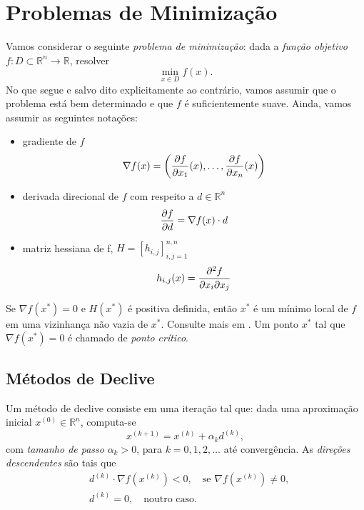 \section{Problemas de Minimização}\label{cap_otimizacao_sec_minimi}

Vamos considerar o seguinte \emph{problema de minimização}: dada a \emph{função objetivo} $f:D\subset \mathbb{R}^n\to\mathbb{R}$, resolver
\begin{equation}
  \min_{x\in D} f(x).
\end{equation}
No que segue e salvo dito explicitamente ao contrário, vamos assumir que o problema está bem determinado e que $f$ é suficientemente suave. Ainda, vamos assumir as seguintes notações:
\begin{itemize}
\item gradiente de $f$
  \begin{equation}
    \nabla f(x) = \left(\frac{\partial f}{\partial x_1}(x),\dotsc,\frac{\partial f}{\partial x_n}(x)\right)
  \end{equation}
\item derivada direcional de $f$ com respeito a $d\in\mathbb{R}^n$
  \begin{equation}
    \frac{\partial f}{\partial d} = \nabla f(x)\cdot d
  \end{equation}
\item matriz hessiana de f, $H=[h_{i,j}]_{i,j=1}^{n,n}$
  \begin{equation}
    h_{i,j}(x) = \frac{\partial^2 f}{\partial x_i\partial x_j}
  \end{equation}
\end{itemize}

\begin{obs}
  Se $\nabla f(x^*) = 0$ e $H(x^*)$ é positiva definida, então $x^*$ é um mínimo local de $f$ em uma vizinhança não vazia de $x^*$. Consulte mais em \cite[Seção 7.2]{Quarteroni2007a}. Um ponto $x^*$ tal que $\nabla f(x^*) = 0$ é chamado de \emph{ponto crítico}.
\end{obs}

\subsection{Métodos de Declive}

Um método de declive consiste em uma iteração tal que: dada uma aproximação inicial $x^{(0)}\in\mathbb{R}^n$, computa-se
\begin{equation}
  x^{(k+1)} = x^{(k)} + \alpha_k d^{(k)},
\end{equation}
com \emph{tamanho de passo} $\alpha_k>0$, para $k=0,1,2,\ldots$ até convergência. As \emph{direções descendentes} são tais que
\begin{align}
  &d^{(k)}\cdot\nabla f(x^{(k)}) < 0,\quad \text{se } \nabla f(x^{(k)}) \neq 0,\label{eq:condDirecoes0}\\
  &d^{(k)} = 0,\quad \text{noutro caso.}\label{eq:condDirecoes1}
\end{align}

